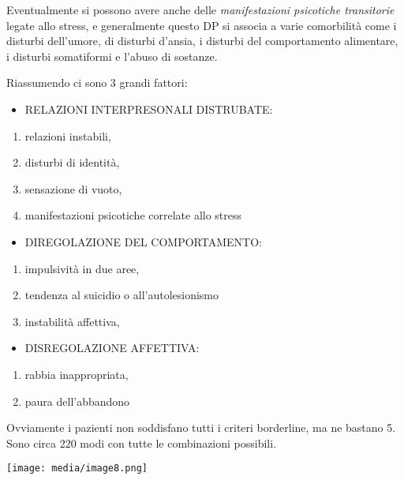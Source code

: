 \documentclass[]{article}
\begin{document}
Eventualmente si possono avere anche delle \emph{manifestazioni
psicotiche transitorie} legate allo stress, e generalmente questo DP si
associa a varie comorbilità come i disturbi dell'umore, di disturbi
d'ansia, i disturbi del comportamento alimentare, i disturbi somatiformi
e l'abuso di sostanze.

Riassumendo ci sono 3 grandi fattori:

\begin{itemize}
\item
  RELAZIONI INTERPRESONALI DISTRUBATE:
\end{itemize}

\begin{enumerate}
\def\labelenumi{\arabic{enumi}.}
\item
  relazioni instabili,
\item
  disturbi di identità,
\item
  sensazione di vuoto,
\item
  manifestazioni psicotiche correlate allo stress
\end{enumerate}

\begin{itemize}
\item
  DIREGOLAZIONE DEL COMPORTAMENTO:
\end{itemize}

\begin{enumerate}
\def\labelenumi{\arabic{enumi}.}
\item
  impulsività in due aree,
\item
  tendenza al suicidio o all'autolesionismo
\item
  instabilità affettiva,
\end{enumerate}

\begin{itemize}
\item
  DISREGOLAZIONE AFFETTIVA:
\end{itemize}

\begin{enumerate}
\def\labelenumi{\arabic{enumi}.}
\item
  rabbia inappropriata,
\item
  paura dell'abbandono
\end{enumerate}

Ovviamente i pazienti non soddisfano tutti i criteri borderline, ma ne
bastano 5. Sono circa 220 modi con tutte le combinazioni possibili.

\texttt{[image: media/image8.png]}
\end{document}
